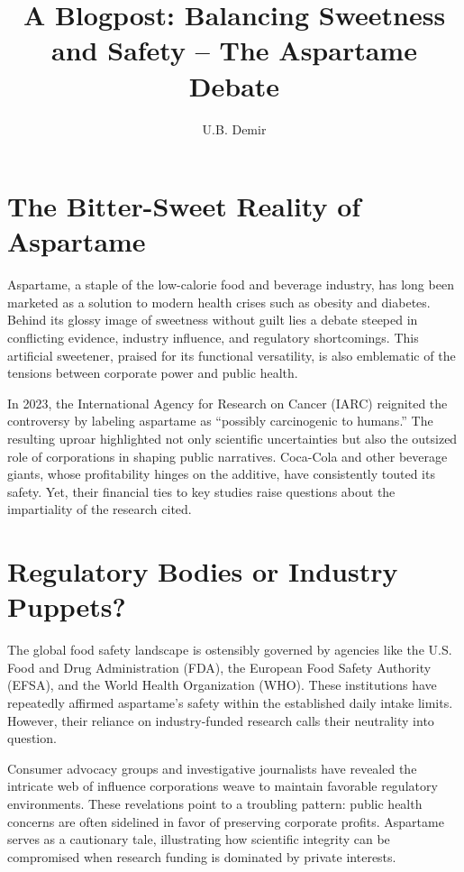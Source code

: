 
\title{A Blogpost: Balancing Sweetness and Safety -- The Aspartame Debate}
\author{U.B. Demir}
\date{}



\maketitle

\section*{The Bitter-Sweet Reality of Aspartame}

Aspartame, a staple of the low-calorie food and beverage industry, has long been marketed as a solution to modern health crises such as obesity and diabetes. Behind its glossy image of sweetness without guilt lies a debate steeped in conflicting evidence, industry influence, and regulatory shortcomings. This artificial sweetener, praised for its functional versatility, is also emblematic of the tensions between corporate power and public health.

In 2023, the International Agency for Research on Cancer (IARC) reignited the controversy by labeling aspartame as “possibly carcinogenic to humans.” The resulting uproar highlighted not only scientific uncertainties but also the outsized role of corporations in shaping public narratives. Coca-Cola and other beverage giants, whose profitability hinges on the additive, have consistently touted its safety. Yet, their financial ties to key studies raise questions about the impartiality of the research cited.

\section*{Regulatory Bodies or Industry Puppets?}

The global food safety landscape is ostensibly governed by agencies like the U.S. Food and Drug Administration (FDA), the European Food Safety Authority (EFSA), and the World Health Organization (WHO). These institutions have repeatedly affirmed aspartame’s safety within the established daily intake limits. However, their reliance on industry-funded research calls their neutrality into question.

Consumer advocacy groups and investigative journalists have revealed the intricate web of influence corporations weave to maintain favorable regulatory environments. These revelations point to a troubling pattern: public health concerns are often sidelined in favor of preserving corporate profits. Aspartame serves as a cautionary tale, illustrating how scientific integrity can be compromised when research funding is dominated by private interests.

